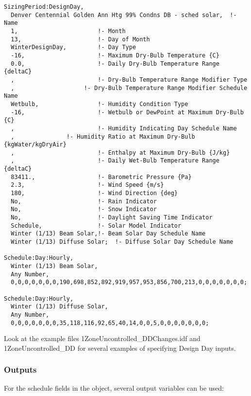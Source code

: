 \begin{lstlisting}
SizingPeriod:DesignDay,
  Denver Centennial Golden Ann Htg 99% Condns DB - sched solar,  !- Name
  1,                       !- Month
  13,                      !- Day of Month
  WinterDesignDay,         !- Day Type
  -16,                     !- Maximum Dry-Bulb Temperature {C}
  0.0,                     !- Daily Dry-Bulb Temperature Range {deltaC}
  ,                        !- Dry-Bulb Temperature Range Modifier Type
  ,                    !- Dry-Bulb Temperature Range Modifier Schedule Name
  Wetbulb,                 !- Humidity Condition Type
  -16,                     !- Wetbulb or DewPoint at Maximum Dry-Bulb {C}
  ,                        !- Humidity Indicating Day Schedule Name
  ,               !- Humidity Ratio at Maximum Dry-Bulb {kgWater/kgDryAir}
  ,                        !- Enthalpy at Maximum Dry-Bulb {J/kg}
  ,                        !- Daily Wet-Bulb Temperature Range {deltaC}
  83411.,                  !- Barometric Pressure {Pa}
  2.3,                     !- Wind Speed {m/s}
  180,                     !- Wind Direction {deg}
  No,                      !- Rain Indicator
  No,                      !- Snow Indicator
  No,                      !- Daylight Saving Time Indicator
  Schedule,                !- Solar Model Indicator
  Winter (1/13) Beam Solar,!- Beam Solar Day Schedule Name
  Winter (1/13) Diffuse Solar;  !- Diffuse Solar Day Schedule Name

Schedule:Day:Hourly,
  Winter (1/13) Beam Solar,
  Any Number,
  0,0,0,0,0,0,0,190,698,852,892,919,957,953,856,700,213,0,0,0,0,0,0,0;

Schedule:Day:Hourly,
  Winter (1/13) Diffuse Solar,
  Any Number,
  0,0,0,0,0,0,0,35,118,116,92,65,40,14,0,0,5,0,0,0,0,0,0,0;
\end{lstlisting}

Look at the example files 1Zone\-Un\-controll\-ed\_\-DD\-Changes.idf and 1Zone\-Un\-controlled\_\-DD for several examples of specifying Design Day inputs.

\subsubsection{Outputs}\label{outputs-018}

For the schedule fields in the object, several output variables can be used:

